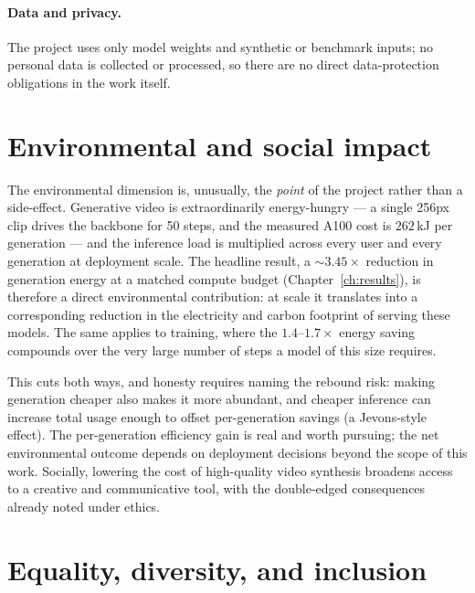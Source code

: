 \documentclass[11pt]{report}
\begin{document}
\paragraph{Data and privacy.} The project uses only model weights and
synthetic or benchmark inputs; no personal data is collected or processed,
so there are no direct data-protection obligations in the work itself.

\section{Environmental and social impact}

The environmental dimension is, unusually, the \emph{point} of the project
rather than a side-effect. Generative video is extraordinarily
energy-hungry --- a single 256px clip drives the backbone for 50 steps, and
the measured A100 cost is $262$\,kJ per generation --- and the inference
load is multiplied across every user and every generation at deployment
scale. The headline result, a ${\sim}3.45\times$ reduction in generation
energy at a matched compute budget (Chapter~\ref{ch:results}), is therefore
a direct environmental contribution: at scale it translates into a
corresponding reduction in the electricity and carbon footprint of serving
these models. The same applies to training, where the $1.4$--$1.7\times$
energy saving compounds over the very large number of steps a model of this
size requires.

This cuts both ways, and honesty requires naming the rebound risk: making
generation cheaper also makes it more abundant, and cheaper inference can
increase total usage enough to offset per-generation savings (a Jevons-style
effect). The per-generation efficiency gain is real and worth pursuing; the
net environmental outcome depends on deployment decisions beyond the scope
of this work. Socially, lowering the cost of high-quality video synthesis
broadens access to a creative and communicative tool, with the
double-edged consequences already noted under ethics.

\section{Equality, diversity, and inclusion}
\end{document}
